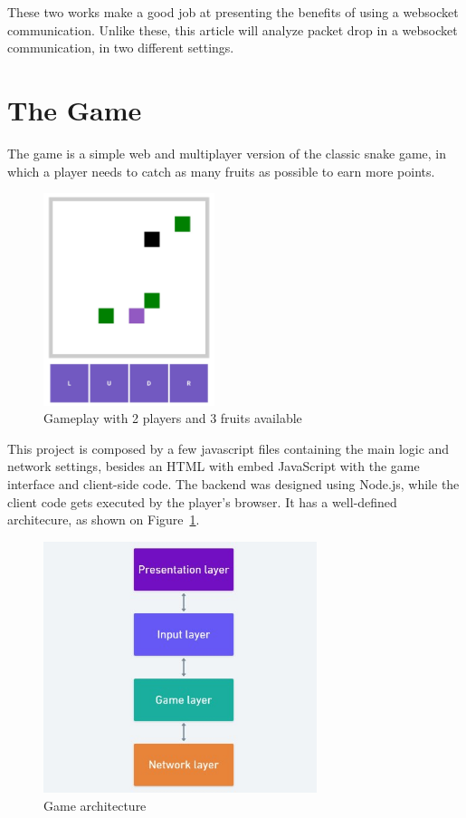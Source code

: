 \documentclass[english]{sbrt}
\begin{document}
These two works make a good job at presenting the benefits of using a websocket communication. Unlike these, this article will analyze packet drop in a websocket communication, in two different settings.

\section{\textbf{The Game}}
The game is a simple web and multiplayer version of the classic snake game, in which a player needs to
catch as many fruits as possible to earn more points.

\begin{figure}[H]
  \centering
  \includegraphics[width=5cm]{game-screen.jpg}
  \caption{Gameplay with 2 players and 3 fruits available}
  \label{game-screen}
\end{figure}

This project is composed by a few javascript files containing the main logic and network settings, besides an HTML with embed JavaScript with the game interface and client-side code. The backend was designed using Node.js, while the client code gets executed by the player's browser. It has a well-defined architecure, as shown on Figure~\ref{game-screen}.

\begin{figure}[H]
  \centering
  \includegraphics[width=8cm]{game-layers.jpg}
  \caption{Game architecture}
  \label{game-layers}
\end{figure}
\end{document}
